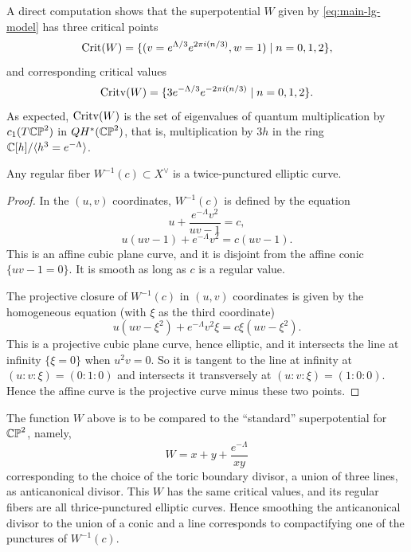 \documentclass[12pt]{amsart}
\begin{document}
A direct computation shows that the superpotential $W$ given by
\eqref{eq:main-lg-model} has three critical points
\begin{equation}
  \label{eq:W-crit-pts}
  \mathrm{Crit}(W) = \{(v = e^{\Lambda/3}e^{2\pi i (n/3)}, w = 1) \mid n = 0, 1, 2\},
\end{equation}
and corresponding critical values
\begin{equation}
  \label{eq:W-crit-vals}
  \mathrm{Critv}(W) = \{3e^{-\Lambda/3}e^{-2\pi i (n/3)} \mid n = 0, 1, 2\}.
\end{equation}
As expected, $\mathrm{Critv}(W)$ is the set of eigenvalues of quantum
multiplication by $c_1(T\mathbb{CP}^2)$ in $QH^*(\mathbb{CP}^2)$, that is,
multiplication by $3h$ in the ring $\mathbb{C}[h]/\langle h^3 = e^{-\Lambda}\rangle$.

\begin{proposition}
  Any regular fiber $W^{-1}(c) \subset X^\vee$ is a twice-punctured elliptic curve.  
\end{proposition}

\begin{proof}
  In the $(u,v)$ coordinates, $W^{-1}(c)$ is defined by the equation
  \begin{equation}
    u + \frac{e^{-\Lambda}v^2}{uv-1} = c,
  \end{equation}
  \begin{equation}
    u(uv-1) + e^{-\Lambda}v^2 = c(uv-1).
  \end{equation}
  This is an affine cubic plane curve, and it is disjoint from the
  affine conic $\{uv - 1=0\}$. It is smooth as long as $c$ is a regular value.

  The projective closure of $W^{-1}(c)$ in $(u,v)$ coordinates is given
  by the homogeneous equation (with $\xi$ as the third coordinate)
  \begin{equation}
    u(uv-\xi^2) + e^{-\Lambda}v^2\xi = c\xi(uv-\xi^2).
  \end{equation}
  This is a projective cubic plane curve, hence elliptic, and it
  intersects the line at infinity $\{\xi = 0\}$ when $u^2v = 0$. So it
  is tangent to the line at infinity at $(u:v:\xi) = (0:1:0)$ and
  intersects it transversely at $(u:v:\xi) = (1:0:0)$. Hence the
  affine curve is the projective curve minus these two points.
\end{proof}

\begin{remark}
  The function $W$ above is to be compared to the ``standard''
  superpotential for $\mathbb{CP}^2$, namely,
  \begin{equation}
    \label{eq:toric-W}
    W = x + y + \frac{e^{-\Lambda}}{xy}
  \end{equation}
  corresponding to the choice of the toric boundary divisor, a union
  of three lines, as anticanonical divisor. This $W$ has the same
  critical values, and its regular fibers are all thrice-punctured
  elliptic curves. Hence smoothing the anticanonical divisor to the
  union of a conic and a line corresponds to compactifying one of the
  punctures of $W^{-1}(c)$. 
\end{remark}
\end{document}
